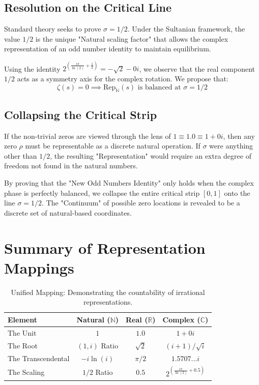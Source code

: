 \documentclass[12pt,a4paper]{article}
\begin{document}
\subsection{Resolution on the Critical Line}
Standard theory seeks to prove $\sigma = 1/2$. Under the Sultanian framework, the value $1/2$ is the unique "Natural scaling factor" that allows the complex representation of an odd number identity to maintain equilibrium. 

Using the identity $2^{\left(\frac{i \pi}{\ln(2)} + \frac{1}{2}\right)} = -\sqrt{2}-0i$, we observe that the real component $1/2$ acts as a symmetry axis for the complex rotation. We propose that:
\begin{equation}
    \zeta(s) = 0 \implies \text{Rep}_{\mathbb{N}}(s) \text{ is balanced at } \sigma = 1/2
\end{equation}

\subsection{Collapsing the Critical Strip}
If the non-trivial zeros are viewed through the lens of $1 \equiv 1.0 \equiv 1+0i$, then any zero $\rho$ must be representable as a discrete natural operation. If $\sigma$ were anything other than $1/2$, the resulting "Representation" would require an extra degree of freedom not found in the natural numbers. 

By proving that the "New Odd Numbers Identity" only holds when the complex phase is perfectly balanced, we collapse the entire critical strip $[0, 1]$ onto the line $\sigma = 1/2$. The "Continuum" of possible zero locations is revealed to be a discrete set of natural-based coordinates.

\section{Summary of Representation Mappings}
\begin{table}[htbp]
\centering
\begin{tabular}{|l|c|c|c|}
\hline
\textbf{Element} & \textbf{Natural ($\mathbb{N}$)} & \textbf{Real ($\mathbb{R}$)} & \textbf{Complex ($\mathbb{C}$)} \\ \hline
The Unit & $1$ & $1.0$ & $1 + 0i$ \\ \hline
The Root & $(1, i)$ Ratio & $\sqrt{2}$ & $(i+1)/\sqrt{i}$ \\ \hline
The Transcendental & $-i \ln(i)$ & $\pi/2$ & $1.5707...i$ \\ \hline
The Scaling & $1/2$ Ratio & $0.5$ & $2^{(\frac{i\pi}{\ln(2)} + 0.5)}$ \\ \hline
\end{tabular}
\caption{Unified Mapping: Demonstrating the countability of irrational representations.}
\end{table}
\end{document}

